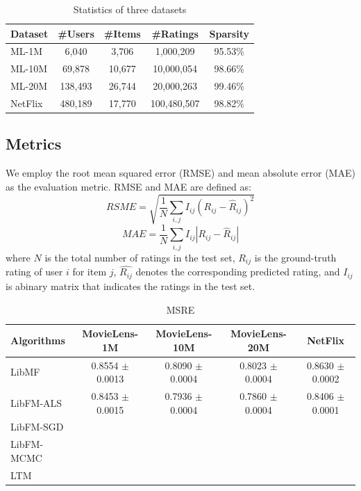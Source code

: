 \documentclass{sig-alternate-05-2015}
\begin{document}
\begin{table}[htpb]
	\centering
	\caption{Statistics of three datasets}
	\label{tab:statistics}
	\begin{tabular}{|l|c|c|c|c|}
		\hline
		\textbf{Dataset} & \textbf{\#Users} & \textbf{\#Items} & \textbf{\#Ratings} & \textbf{Sparsity} \\
		\hline
		ML-1M  & 6,040    & 3,706  & 1,000,209   & 95.53\% \\
		ML-10M & 69,878   & 10,677 & 10,000,054  & 98.66\% \\
		ML-20M & 138,493  & 26,744 & 20,000,263  & 99.46\% \\
		NetFlix & 480,189 & 17,770 & 100,480,507 & 98.82\% \\
		\hline
	\end{tabular}
\end{table}

\subsection{Metrics}
We employ the root mean squared error (RMSE) and mean absolute error (MAE) as the evaluation metric.
RMSE and MAE are defined as:
\begin{equation}
	RSME = \sqrt{ \frac{1}{N} \sum_{i,j} I_{ij} (R_{ij} - \hat{R}_{ij})^2 }
\end{equation}
\begin{equation}
	MAE = \frac{1}{N} \sum_{i,j} I_{ij} |R_{ij} - \hat{R}_{ij}|
\end{equation}
where $N$ is the total number of ratings in the test set,
$R_{ij}$ is the ground-truth rating of user $i$ for item $j$,
$\hat{R_{ij}}$ denotes the corresponding predicted rating,
and $I_{ij}$ is abinary matrix that indicates the ratings in the test set.




\begin{table}[htpb]
	\centering
	\caption{MSRE}
	\label{tab:msre}
	\begin{tabular}{|l|c|c|c|c|}
		\hline
		\textbf{Algorithms} & \textbf{MovieLens-1M} & \textbf{MovieLens-10M} & \textbf{MovieLens-20M}  & \textbf{NetFlix} \\
		\hline
		LibMF      & 0.8554 $\pm$ 0.0013 & 0.8090 $\pm$ 0.0004 & 0.8023 $\pm$ 0.0004 & 0.8630 $\pm$ 0.0002 \\
		LibFM-ALS  & 0.8453 $\pm$ 0.0015 & 0.7936 $\pm$ 0.0004 & 0.7860 $\pm$ 0.0004 & 0.8406 $\pm$ 0.0001 \\
		LibFM-SGD  &  &  &  & \\
		LibFM-MCMC &  &  &  & \\
		LTM        &  &  &  & \\
		\hline
	\end{tabular}
\end{table}
\end{document}
